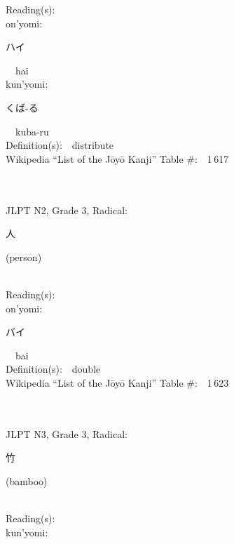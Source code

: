 \begin{multicols}{2}
Reading(s):\ \ \\
{\hspace*{1em}}on'yomi:\ \ \\
{\hspace*{2em}}{\begin{CJK}{UTF8}{min} ハイ \end{CJK}}\ \ hai\ \ \\
{\hspace*{1em}}kun'yomi:\ \ \\
{\hspace*{2em}}{\begin{CJK}{UTF8}{min} くば-る \end{CJK}}\ \ kuba-ru\ \ \\
Definition(s):\ \ distribute \\
Wikipedia ``List of the J\=oy\=o Kanji'' Table \#:\ \ 1\,617 \\
\ \ \\
{\fontsize{34pt}{40pt}  }\ \ \\  %
{JLPT N2, Grade 3, Radical:\ \ {\begin{CJK}{UTF8}{min} 人 \end{CJK}} (person) } \\
Reading(s):\ \ \\
{\hspace*{1em}}on'yomi:\ \ \\
{\hspace*{2em}}{\begin{CJK}{UTF8}{min} バイ \end{CJK}}\ \ bai\ \ \\
Definition(s):\ \ double \\
Wikipedia ``List of the J\=oy\=o Kanji'' Table \#:\ \ 1\,623 \\
\ \ \\
{\fontsize{34pt}{40pt}  }\ \ \\  %
{JLPT N3, Grade 3, Radical:\ \ {\begin{CJK}{UTF8}{min} 竹 \end{CJK}} (bamboo) } \\
Reading(s):\ \ \\
{\hspace*{1em}}kun'yomi:\ \ \\

\end{multicols}
